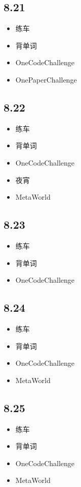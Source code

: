 \documentclass[UTF8]{ctexart}
\begin{document}
\subsection*{8.21}
\begin{itemize}
    \item 练车
    \item 背单词
    \item OneCodeChallenge
    \item OnePaperChallenge
\end{itemize}

\subsection*{8.22}
\begin{itemize}
    \item 练车
    \item 背单词
    \item OneCodeChallenge
    \item 夜宵
    \item MetaWorld
\end{itemize}

\subsection*{8.23}
\begin{itemize}
    \item 练车
    \item 背单词
    \item OneCodeChallenge
\end{itemize}

\subsection*{8.24}
\begin{itemize}
    \item 练车
    \item 背单词
    \item OneCodeChallenge
    \item MetaWorld
\end{itemize}

\subsection*{8.25}
\begin{itemize}
    \item 练车
    \item 背单词
    \item OneCodeChallenge
    \item MetaWorld
\end{itemize}
\end{document}

